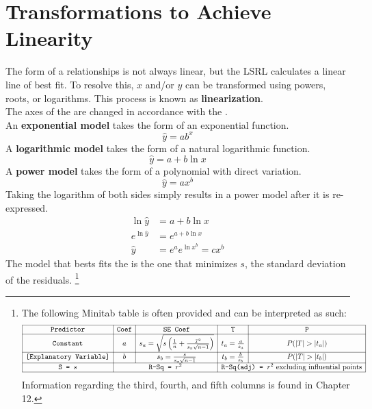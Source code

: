 \documentclass[../AP_Statistics.tex]{subfiles}
\begin{document}
		\section{Transformations to Achieve Linearity}
			The form of a relationships is not always linear, but the LSRL calculates a linear line of best fit. To resolve this, $x$ and/or $y$ can be transformed using powers, roots, or logarithms. This process is known as \textbf{linearization}. \\
			The axes of the  are changed in accordance with the . \\
			An \textbf{exponential model} takes the form of an exponential function.
			\[\hat{y} = ab^x\]
			A \textbf{logarithmic model} takes the form of a natural logarithmic function.
			\[\hat{y} = a + b\ln x\]
			A \textbf{power model} takes the form of a polynomial with direct variation.
			\[\hat{y} = ax^b\]
			Taking the logarithm of both sides simply results in a power model after it is re-expressed.
			\begin{align*}
				\ln \hat{y} &= a + b\ln x \\
				e^{\ln \hat{y}} &= e^{a + b\ln x} \\
				\hat{y} &= e^a e^{\ln x^b} = cx^b
			\end{align*}
			The model that bests fits the  is the one that minimizes $s$, the standard deviation of the residuals.
			\footnote{
				The following Minitab table is often provided and can be interpreted as such:
				\[\begin{array}{|c|c|c|c|c|}\hline
					\texttt{Predictor} & \texttt{Coef} & \texttt{SE Coef} & \texttt{T} & \texttt{P} \\\hline
					\texttt{Constant} & a & s_a = \sqrt{s\left(\frac{1}{n} + \frac{\bar{x}^2}{s_x\sqrt{n - 1}}\right)} & t_a = \frac{a}{s_a} & P(|T| > |t_a|) \\\hline
					\texttt{[Explanatory Variable]} & b & s_b = \frac{s}{s_x\sqrt{n - 1}} & t_b = \frac{b}{s_b} & P(|T| > |t_b|) \\\hline
					\texttt{S = } s & \multicolumn{2}{c|}{\texttt{R-Sq = } r^2} & \multicolumn{2}{c|}{\texttt{R-Sq(adj) = } r^2 \text{ excluding influential points}} \\\hline
				\end{array}\]
				Information regarding the third, fourth, and fifth columns is found in Chapter 12.
			}
\end{document}

